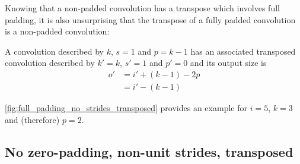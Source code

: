 \documentclass{article}
\begin{document}
Knowing that a non-padded convolution has a transpose which involves full
padding, it is also unsurprising that the transpose of a fully padded
convolution is a non-padded convolution:

\begin{prop}\label{prop:full_padding_no_strides_transposed}
A convolution described by $k$, $s = 1$ and $p = k - 1$ has an associated
transposed convolution described by $k' = k$, $s' = 1$ and $p' = 0$ and its
output size is
\begin{equation*}
\begin{split}
    o' &= i' + (k - 1) - 2p \\
       &= i' - (k - 1)
\end{split}
\end{equation*}
\end{prop}

\autoref{fig:full_padding_no_strides_transposed} provides an example for $i =
5$, $k = 3$ and (therefore) $p = 2$.

\subsection{No zero-padding, non-unit strides, transposed}
\end{document}
